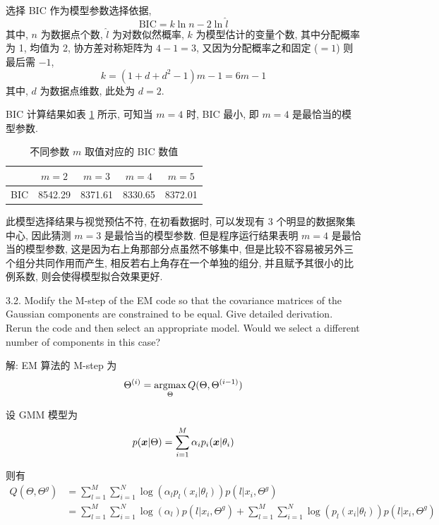 \documentclass{article}
\begin{document}
选择 BIC 作为模型参数选择依据, 
\begin{equation}
  \mathrm{BIC}=k\ln n-2\ln\hat{l}
\end{equation}
其中, $n$ 为数据点个数, $\hat{l}$ 为对数似然概率, $k$ 为模型估计的变量个数, 其中分配概率为 1, 均值为 2, 协方差对称矩阵为 $4-1=3$, 又因为分配概率之和固定 ($=1$) 则最后需 $-1$,
\begin{equation}
  k=(1+d+d^2-1)m-1=6m-1
\end{equation}
其中, $d$ 为数据点维数, 此处为 $d=2$.

BIC 计算结果如表 \ref{tab:bic} 所示, 可知当 $m=4$ 时, BIC 最小, 即 $m=4$ 是最恰当的模型参数. 

\begin{table}[htbp]
  \centering
  \caption{不同参数 $m$ 取值对应的 BIC 数值}
  \label{tab:bic}
  \begin{tabular}{ccccc}
    \hline
        & $m=2$ & $m=3$ & $m=4$ & $m=5$ \\
    \hline
    BIC & 8542.29 & 8371.61 & 8330.65 & 8372.01\\
    \hline
  \end{tabular}
\end{table}

此模型选择结果与视觉预估不符, 在初看数据时, 可以发现有 3 个明显的数据聚集中心, 因此猜测 $m=3$ 是最恰当的模型参数. 但是程序运行结果表明 $m=4$ 是最恰当的模型参数, 这是因为右上角那部分点虽然不够集中, 但是比较不容易被另外三个组分共同作用而产生, 相反若右上角存在一个单独的组分, 并且赋予其很小的比例系数, 则会使得模型拟合效果更好.

3.2. Modify the M-step of the EM code so that the covariance matrices of the Gaussian components are constrained to be equal. Give detailed derivation. Rerun the code and then select an appropriate model. Would we select a different number of components in this case?

解: EM 算法的 M-step 为
\begin{equation}
  \Theta^{(i)}=\operatorname*{argmax}_{\Theta} Q(\Theta,\Theta^{(i-1)})
\end{equation}

设 GMM 模型为
\begin{equation}
  p(\bm{x}|\Theta)=\sum_{i=1}^M\alpha_ip_i(\bm{x}|\theta_i)
\end{equation}

则有
\begin{equation}
  \begin{aligned}
    Q(\Theta,\Theta^g)
    &=\sum_{l=1}^M\sum_{i=1}^N\log(\alpha_lp_l(x_i|\theta_l))p(l|x_i,\Theta^g)\\
    &=\sum_{l=1}^M\sum_{i=1}^N\log(\alpha_l)p(l|x_i,\Theta^g)+\sum_{l=1}^M\sum_{i=1}^N\log(p_l(x_i|\theta_l))p(l|x_i,\Theta^g)
  \end{aligned}
\end{equation}
\end{document}
